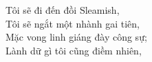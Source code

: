 \indent
Tôi sẽ đi đến đồi Sleamish,\\
Tôi sẽ ngắt một nhành gai tiên,\\
\indent
Mặc vong linh giáng đày công sự;\\
\indent
Lành dữ gì tôi cũng điềm nhiên,\\